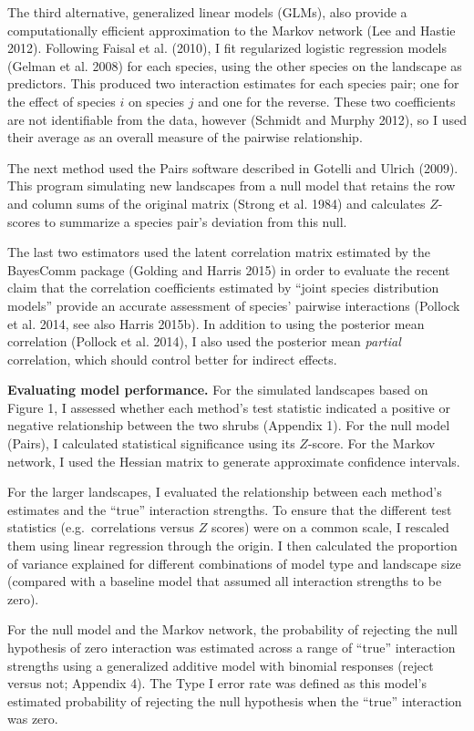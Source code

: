 \documentclass[12pt,]{article}
\begin{document}
\begin{spacing}{1.9}
\begin{flushleft}
The third alternative, generalized linear models (GLMs), also provide a
computationally efficient approximation to the Markov network (Lee and
Hastie 2012). Following Faisal et al. (2010), I fit regularized logistic
regression models (Gelman et al. 2008) for each species, using the other
species on the landscape as predictors. This produced two interaction
estimates for each species pair; one for the effect of species \(i\) on
species \(j\) and one for the reverse. These two coefficients are not
identifiable from the data, however (Schmidt and Murphy 2012), so I used
their average as an overall measure of the pairwise relationship.

The next method used the Pairs software described in Gotelli and Ulrich
(2009). This program simulating new landscapes from a null model that
retains the row and column sums of the original matrix (Strong et al.
1984) and calculates \(Z\)-scores to summarize a species pair's
deviation from this null.

The last two estimators used the latent correlation matrix estimated by
the BayesComm package (Golding and Harris 2015) in order to evaluate the
recent claim that the correlation coefficients estimated by ``joint
species distribution models'' provide an accurate assessment of species'
pairwise interactions (Pollock et al. 2014, see also Harris 2015b). In
addition to using the posterior mean correlation (Pollock et al. 2014),
I also used the posterior mean \emph{partial} correlation, which should
control better for indirect effects.

\noindent \textbf{Evaluating model performance.} For the simulated
landscapes based on Figure 1, I assessed whether each method's test
statistic indicated a positive or negative relationship between the two
shrubs (Appendix 1). For the null model (Pairs), I calculated
statistical significance using its \(Z\)-score. For the Markov network,
I used the Hessian matrix to generate approximate confidence intervals.

For the larger landscapes, I evaluated the relationship between each
method's estimates and the ``true'' interaction strengths. To ensure
that the different test statistics (e.g.~correlations versus \(Z\)
scores) were on a common scale, I rescaled them using linear regression
through the origin. I then calculated the proportion of variance
explained for different combinations of model type and landscape size
(compared with a baseline model that assumed all interaction strengths
to be zero).

For the null model and the Markov network, the probability of rejecting
the null hypothesis of zero interaction was estimated across a range of
``true'' interaction strengths using a generalized additive model with
binomial responses (reject versus not; Appendix 4). The Type I error
rate was defined as this model's estimated probability of rejecting the
null hypothesis when the ``true'' interaction was zero.


\end{flushleft}
\end{spacing}
\end{document}
